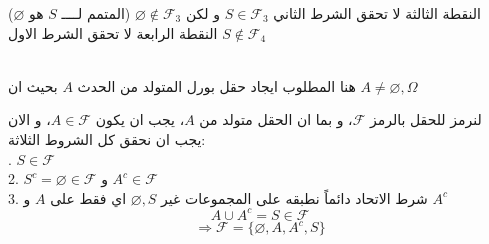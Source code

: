 \begin{example}
	\begin{flushleft}
	\end{flushleft}
	النقطة الثالثة لا تحقق الشرط الثاني  \(S\in \mathcal{F}_3\) و لكن \(\varnothing \notin \mathcal{F}_3\) (المتمم لــــ \(S\) هو \(\varnothing\))\\
	النقطة الرابعة لا تحقق الشرط الاول \(S \notin \mathcal{F}_4\)
\end{example}

\begin{example}
	\\
	هنا المطلوب ايجاد حقل بورل المتولد من الحدث \(A\) بحيث ان \(A\neq \varnothing, \Omega\)
\end{example}

\begin{solution}
	لنرمز للحقل بالرمز \(\mathcal{F}\)، و بما ان الحقل متولد من \(A\)، يجب ان يكون \(A \in \mathcal{F}\)، و الان يجب ان نحقق كل الشروط الثلاثة:\\. \(S \in \mathcal{F}\)\\
	2. \(S^c =\varnothing \in \mathcal{F}\) و \(A^c \in \mathcal{F}\)\\
	3. شرط الاتحاد دائماً نطبقه على المجموعات غير \(\varnothing, S\) اي فقط على \(A\) و \(A^c\)
	\[
	A \cup A^c = S \in \mathcal{F}
	\]
	\[
	\Rightarrow \mathcal{F} = \{\varnothing, A, A^c, S\}
	\]
\end{solution}

\begin{example}
\end{example}

